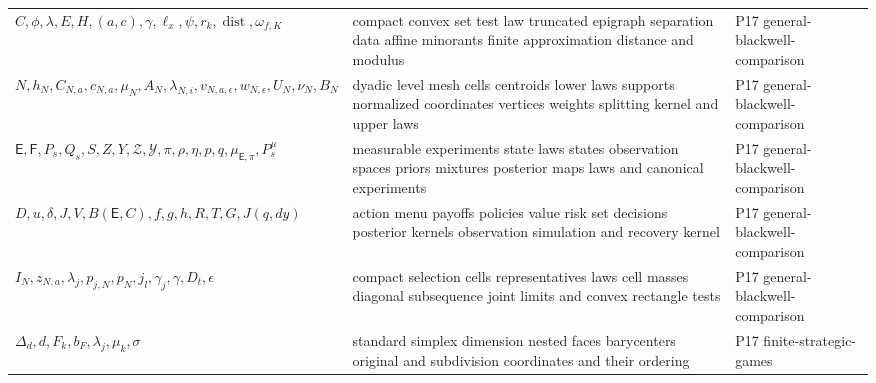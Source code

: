 \begin{longtable}{@{}p{}p{}p{}@{}}
\(C,\allowbreak \phi,\allowbreak \lambda,\allowbreak E,\allowbreak H,\allowbreak (a,\allowbreak c),\allowbreak \gamma,\allowbreak \ell_x,\allowbreak \psi,\allowbreak r_k,\allowbreak \operatorname{dist},\allowbreak \omega_{f,K}\) & compact convex set test law truncated epigraph separation data affine minorants finite approximation distance and modulus & P17 general-\allowbreak{}blackwell-\allowbreak{}comparison \\
\(N,\allowbreak h_N,\allowbreak C_{N,a},\allowbreak c_{N,a},\allowbreak \mu_N,\allowbreak A_N,\allowbreak \lambda_{N,i},\allowbreak v_{N,a,\epsilon},\allowbreak w_{N,\epsilon},\allowbreak U_N,\allowbreak \nu_N,\allowbreak B_N\) & dyadic level mesh cells centroids lower laws supports normalized coordinates vertices weights splitting kernel and upper laws & P17 general-\allowbreak{}blackwell-\allowbreak{}comparison \\
\(\mathsf E,\allowbreak \mathsf F,\allowbreak P_s,\allowbreak Q_s,\allowbreak S,\allowbreak Z,\allowbreak Y,\allowbreak \mathcal Z,\allowbreak \mathcal Y,\allowbreak \pi,\allowbreak \rho,\allowbreak \eta,\allowbreak p,\allowbreak q,\allowbreak \mu_{\mathsf E,\pi},\allowbreak P_s^\mu\) & measurable experiments state laws states observation spaces priors mixtures posterior maps laws and canonical experiments & P17 general-\allowbreak{}blackwell-\allowbreak{}comparison \\
\(D,\allowbreak u,\allowbreak \delta,\allowbreak J,\allowbreak V,\allowbreak B(\mathsf E,\allowbreak C),\allowbreak f,\allowbreak g,\allowbreak h,\allowbreak R,\allowbreak T,\allowbreak G,\allowbreak J(q,\allowbreak dy)\) & action menu payoffs policies value risk set decisions posterior kernels observation simulation and recovery kernel & P17 general-\allowbreak{}blackwell-\allowbreak{}comparison \\
\(I_N,\allowbreak z_{N,a},\allowbreak \lambda_j,\allowbreak p_{j,N},\allowbreak p_N,\allowbreak j_l,\allowbreak \gamma_j,\allowbreak \gamma,\allowbreak D_t,\allowbreak \epsilon\) & compact selection cells representatives laws cell masses diagonal subsequence joint limits and convex rectangle tests & P17 general-\allowbreak{}blackwell-\allowbreak{}comparison \\
\(\Delta_d,\allowbreak d,\allowbreak F_k,\allowbreak b_F,\allowbreak \lambda_j,\allowbreak \mu_k,\allowbreak \sigma\) & standard simplex dimension nested faces barycenters original and subdivision coordinates and their ordering & P17 finite-\allowbreak{}strategic-\allowbreak{}games \\

\end{longtable}
